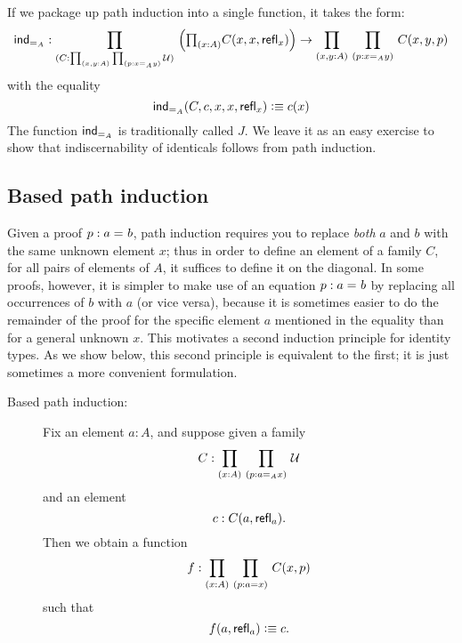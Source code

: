 If we package up path induction into a single function, it takes the form:
\begin{align*}
  \indid{A} :  \dprd{C : \prd{x,y:A}{p:x =_A y} \UU} 
  \Big(\tprd{x:A} C(x,x,\refl{x})\Big) \to  \dprd{x,y:A}{p:x =_A y}   C(x,y,p)
\end{align*}
with the equality
\[ \mathsf{ind}_{=_{A}}(C,c,x,x,\mathsf{refl}_{x}) \vcentcolon\equiv c(x) \]
The function $ \mathsf{ind}_{=_{A}}$ is traditionally called $J$.  We leave it as an easy exercise to show that indiscernability of identicals follows from path induction.  

\subsection{Based path induction}

Given a proof $p : a =_{} b$, 
path induction requires you to replace \emph{both} $a$ and $b$ with the same unknown element $x$; thus in order to define an element of a family
$C$, for all pairs of elements of $A$, it suffices to define it on the  diagonal.
In some proofs, however, it is simpler to make use of an equation $p : a =_{} b$ by replacing all occurrences of $b$ with $a$ (or vice versa), because it is sometimes easier to do the remainder of the proof for the specific element $a$ mentioned in the equality than for a general unknown $x$.  This motivates a second induction principle for identity types.  As we show below, this second principle is equivalent to the first; it is just sometimes a more convenient formulation.

%
\begin{description}
\item[Based path induction:] 
  Fix an element $a:A$, and suppose given a family
  \[ C : \prd{x:A}{p : a =_A x} \UU \]
  and an element
  \[ c : C(a,\mathsf{refl}_{a}). \]
  Then we obtain a function
  \[ f : \prd{x:A}{p:a = x} C(x,p) \]
  such that
  \[ f(a,\mathsf{refl}_{a}) \vcentcolon\equiv c .\]
\end{description}

